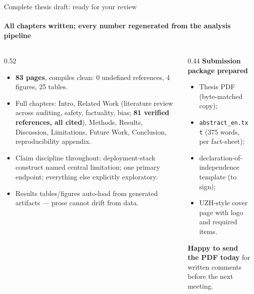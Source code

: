 \documentclass[aspectratio=169,onlytextwidth]{beamer}
\begin{document}
\begin{frame}[shrink=8]{Complete thesis draft: ready for your review}
\framesubtitle{All chapters written; every number regenerated from the analysis pipeline}
\begin{columns}[T,totalwidth=\textwidth]
\begin{column}{0.52\textwidth}
\small
\begin{itemize}
  \item \textbf{83 pages}, compiles clean: 0 undefined references, 4 figures, 25 tables.
  \item Full chapters: Intro, Related Work (literature review across auditing, safety, factuality, bias; \textbf{81 verified references, all cited}), Methods, Results, Discussion, Limitations, Future Work, Conclusion, reproducibility appendix.
  \item Claim discipline throughout: deployment-stack construct named central limitation; one primary endpoint; everything else explicitly exploratory.
  \item Results tables/figures auto-load from generated artifacts --- prose cannot drift from data.
\end{itemize}
\end{column}
\begin{column}{0.44\textwidth}
\textbf{Submission package prepared}\\[4pt]
\small
\begin{itemize}
  \item Thesis PDF (byte-matched copy);
  \item \texttt{abstract\_en.txt} (375 words, per fact-sheet);
  \item declaration-of-independence template (to sign);
  \item UZH-style cover page with logo and required items.
\end{itemize}
\vspace{0.2cm}
\textbf{Happy to send the PDF today} for written comments before the next meeting.
\end{column}
\end{columns}
\end{frame}
\end{document}
